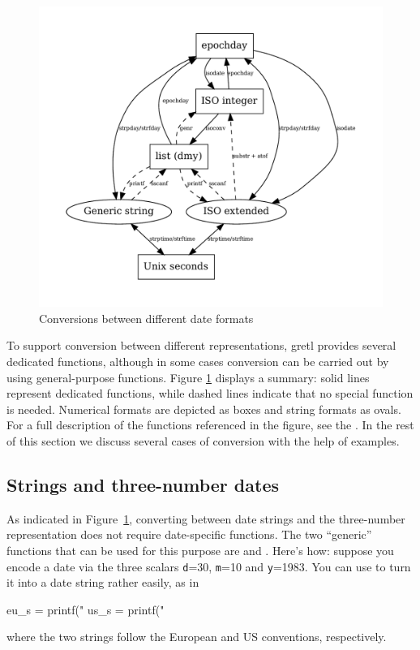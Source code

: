 \begin{figure}[htbp]
  \centering
  \includegraphics[scale=0.667]{figures/date-conversion}
  \caption{Conversions between different date formats}
  \label{fig:cal-conversions}
\end{figure}

To support conversion between different representations, gretl
provides several dedicated functions, although in some cases
conversion can be carried out by using general-purpose
functions. Figure \ref{fig:cal-conversions} displays a summary: solid
lines represent dedicated functions, while dashed lines indicate that
no special function is needed. Numerical formats are depicted as boxes
and string formats as ovals. For a full description of the functions
referenced in the figure, see the \GCR. In the rest of this section we
discuss several cases of conversion with the help of examples.

\subsection{Strings and three-number dates}

As indicated in Figure~\ref{fig:cal-conversions}, converting between
date strings and the three-number representation does not require
date-specific functions. The two ``generic'' functions that can be
used for this purpose are  and . Here's how:
suppose you encode a date via the three scalars \texttt{d}=30,
\texttt{m}=10 and \texttt{y}=1983. You can use  to turn it
into a date string rather easily, as in
\begin{code}
  eu_s = printf("%
  us_s = printf("%
\end{code}
where the two strings follow the European and US conventions,
respectively.

